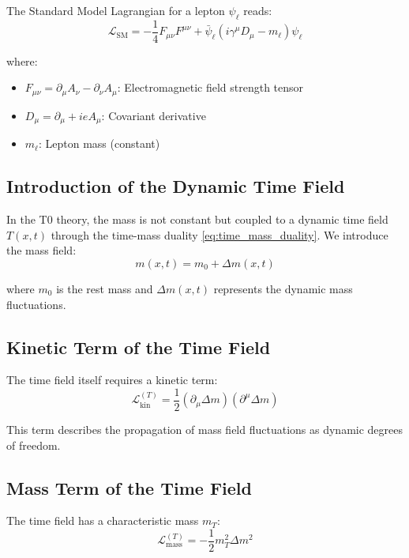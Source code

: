 	The Standard Model Lagrangian for a lepton $\psi_\ell$ reads:
	\begin{equation}
		\mathcal{L}_{\text{SM}} = -\frac{1}{4} F_{\mu\nu}F^{\mu\nu} + \bar{\psi}_\ell(i\gamma^\mu D_\mu - m_\ell)\psi_\ell
		\label{eq:sm_lagrangian}
	\end{equation}
	
	where:
	\begin{itemize}
		\item $F_{\mu\nu} = \partial_\mu A_\nu - \partial_\nu A_\mu$: Electromagnetic field strength tensor
		\item $D_\mu = \partial_\mu + ie A_\mu$: Covariant derivative
		\item $m_\ell$: Lepton mass (constant)
	\end{itemize}
	
	\subsection{Introduction of the Dynamic Time Field}
	
	In the T0 theory, the mass is not constant but coupled to a dynamic time field $T(x,t)$ through the time-mass duality \eqref{eq:time_mass_duality}. We introduce the mass field:
	\begin{equation}
		m(x,t) = m_0 + \Delta m(x,t)
		\label{eq:mass_field}
	\end{equation}
	
	where $m_0$ is the rest mass and $\Delta m(x,t)$ represents the dynamic mass fluctuations.
	
	\subsection{Kinetic Term of the Time Field}
	
	The time field itself requires a kinetic term:
	\begin{equation}
		\mathcal{L}_{\text{kin}}^{(T)} = \frac{1}{2}(\partial_\mu \Delta m)(\partial^\mu \Delta m)
		\label{eq:time_field_kinetic}
	\end{equation}
	
	This term describes the propagation of mass field fluctuations as dynamic degrees of freedom.
	
	\subsection{Mass Term of the Time Field}
	
	The time field has a characteristic mass $m_T$:
	\begin{equation}
		\mathcal{L}_{\text{mass}}^{(T)} = -\frac{1}{2} m_T^2 \Delta m^2
		\label{eq:time_field_mass}
	\end{equation}
	

